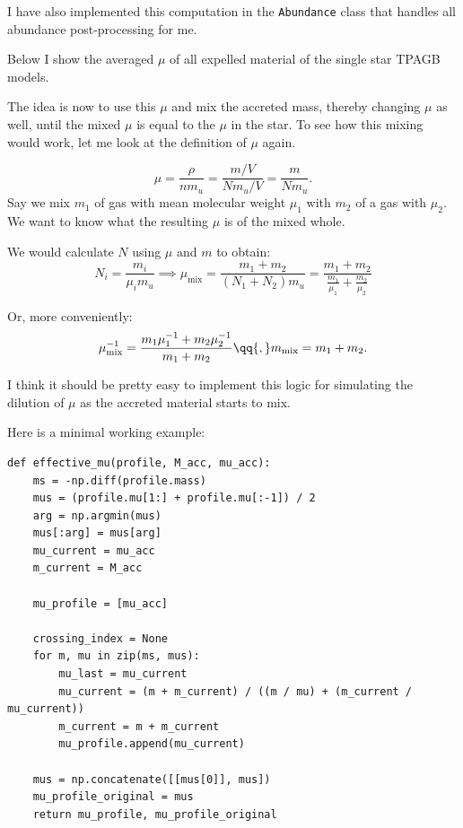 \documentclass[a4paper,10pt]{article}
\begin{document}
I have also implemented this computation in the \lstinline[style=output, breaklines=true]|Abundance| class that handles all
 abundance post-processing for me.

Below I show the averaged \(\mu\) of all expelled material of the single star TPAGB models.
\begin{figure}[ht]
    \centering
\end{figure}

The idea is now to use this \(\mu\) and mix the accreted mass, thereby changing \(\mu\) as well,
until the mixed \(\mu\) is equal to the \(\mu\) in the star.
To see how this mixing would work, let me look at the definition of \(\mu\) again.

\begin{equation*}
    \mu = \frac{\rho}{n m_{u} } = \frac{m / V}{Nm_{u} / V} = \frac{m}{Nm_{u}}.
\end{equation*}
Say we mix \(m_{1}\) of gas with mean molecular weight \(\mu_{1} \) with \(m_{2}\) of a gas with \(\mu_{2}\).
We want to know what the resulting \(\mu \) is of the mixed whole.

We would calculate \(N\) using \(\mu \) and \(m\) to obtain:
\begin{equation*}
    N_{i} = \frac{m_{i}}{\mu_{i} m_{u}} \implies \mu_\text{mix} = \frac{m_{1} + m_{2}}{(N_{1}+N_{2})m_{u}} = \frac{m_{1} + m_{2}}{\frac{m_{1}}{\mu_{1}} + \frac{m_{2}}{\mu_{2} } }
\end{equation*}

Or, more conveniently:
\begin{equation*}
    \mu_\text{mix}^{-1}  = \frac{m_{1}\mu_{1}^{-1} + m_{2}\mu_{2}^{-1}  }{m_{1}+m_{2} }\qq{,} m_\text{mix} = m_{1} +m_{2}.
\end{equation*}

I think it should be pretty easy to implement this logic for simulating the dilution of \(\mu \) as the
accreted material starts to mix.

Here is a minimal working example:
\begin{verbatim}
def effective_mu(profile, M_acc, mu_acc):
    ms = -np.diff(profile.mass)
    mus = (profile.mu[1:] + profile.mu[:-1]) / 2
    arg = np.argmin(mus)
    mus[:arg] = mus[arg]
    mu_current = mu_acc
    m_current = M_acc

    mu_profile = [mu_acc]

    crossing_index = None
    for m, mu in zip(ms, mus):
        mu_last = mu_current
        mu_current = (m + m_current) / ((m / mu) + (m_current / mu_current))
        m_current = m + m_current
        mu_profile.append(mu_current)

    mus = np.concatenate([[mus[0]], mus])
    mu_profile_original = mus
    return mu_profile, mu_profile_original
\end{verbatim}
\end{document}

